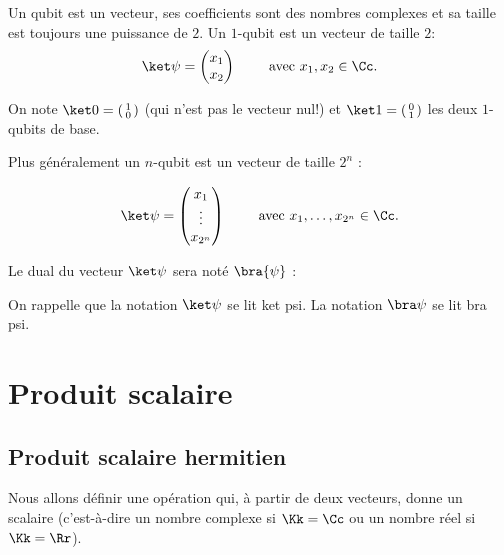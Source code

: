 \documentclass[11pt,class=report,crop=false]{standalone}
\begin{document}
Un qubit est un vecteur, ses coefficients sont des nombres complexes et sa taille est toujours
une puissance de $2$.
Un $1$-qubit est un vecteur de taille $2$:
$$\ket\psi = \begin{pmatrix}x_1 \\ x_2 \end{pmatrix}
\qquad \text{ avec } x_1,x_2 \in \Cc.$$

On note $\ket0 = \left(\begin{smallmatrix}1 \\ 0 \end{smallmatrix}\right)$ (qui n'est pas le vecteur nul!) et $\ket1 = \left(\begin{smallmatrix}0 \\ 1 \end{smallmatrix}\right)$ les deux $1$-qubits de base.

Plus généralement un $n$-qubit est un vecteur de taille $2^n$ :

$$\ket\psi = \begin{pmatrix}x_1 \\ \vdots \\ x_{2^n} \end{pmatrix}
\qquad \text{ avec } x_1,\ldots,x_{2^n} \in \Cc.$$

Le dual du vecteur $\ket\psi$ sera noté $\bra{\psi}$ :


On rappelle que la notation $\ket\psi$ se lit \og{}ket psi\fg{}.
La notation $\bra\psi$ se lit \og{}bra psi\fg{}.



\section{Produit scalaire}

\subsection{Produit scalaire hermitien}

Nous allons définir une opération qui, à partir de deux vecteurs, donne un scalaire (c'est-à-dire un nombre complexe si $\Kk=\Cc$ ou un nombre réel si $\Kk=\Rr$).
\end{document}
